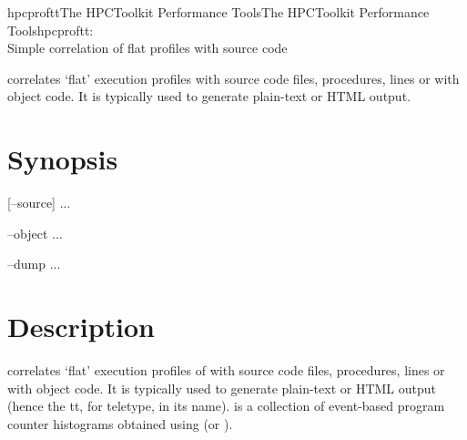 \documentclass[english]{article}
\begin{document}
\begin{Name}{1}{hpcproftt}{The HPCToolkit Performance Tools}{The HPCToolkit Performance Tools}{hpcproftt:\\ Simple correlation of flat profiles with source code}

 correlates `flat' execution profiles with source code files, procedures, lines or with object code.
It is typically used to generate plain-text or HTML output.

\end{Name}

\section{Synopsis}

 [--source]  ...

 --object  ...

 --dump ...


\section{Description}

 correlates `flat' execution profiles of  with source code files, procedures, lines or with object code.
It is typically used to generate plain-text or HTML output (hence the tt, for teletype, in its name).
 is a collection of event-based program counter histograms obtained using  (or ).
\end{document}
